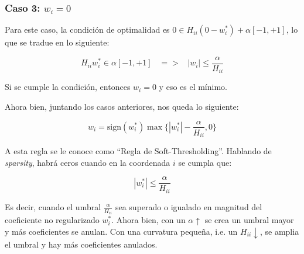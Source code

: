 \subsubsection*{\textbf{Caso 3:} $w_i = 0$}

Para este caso, la condición de optimalidad es $0 \in H_{ii}(0 - w_i^*) + \alpha[-1,+1]$, lo que 
se tradue en lo siguiente:

\[
    H_{ii}w_i^* \in \alpha[-1,+1]  \;\;\; => \;\;\; |w_i| \leq \frac{\alpha}{H_{ii}}
\]

Si se cumple la condición, entonces $w_i = 0$ y eso es el mínimo.

Ahora bien, juntando los casos anteriores, nos queda lo siguiente:

\[%
    w_i = \text{sign}(w_i^*) \max{ \{|w_i^*| - \frac{\alpha}{H_{ii}}, 0\} }
\]

A esta regla se le conoce como ``Regla de Soft-Thresholding''. Hablando de \textit{sparsity}, habrá
ceros cuando en la coordenada $i$ se cumpla que:

\[
    |w_i^*| \leq \frac{\alpha}{H_{ii}}
\]

Es decir, cuando el umbral $\frac{\alpha}{H_{ii}}$ sea superado o igualado en magnitud del coeficiente
no regularizado $w_i^*$. Ahora bien, con un $\alpha \uparrow$ se crea un umbral mayor y más coeficientes 
se anulan. Con una curvatura pequeña, i.e. un $H_{ii}\downarrow$, se amplia el umbral y hay más coeficientes
anulados. 




\clearpage




